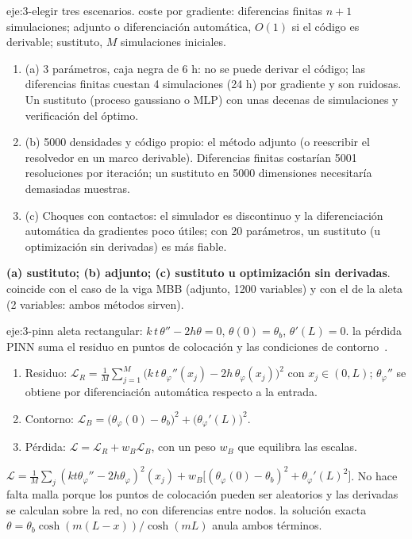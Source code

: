 \begin{solucion}{eje:3-elegir}
\datos tres escenarios.
\planteamiento coste por gradiente: diferencias finitas $n+1$ simulaciones; adjunto o diferenciación automática, $O(1)$ si el código es derivable; sustituto, $M$ simulaciones iniciales.
\pasos
\begin{enumerate}[label=\arabic*.]
  \item (a) 3 parámetros, caja negra de 6 h: no se puede derivar el código; las diferencias finitas cuestan 4 simulaciones (24 h) por gradiente y son ruidosas. Un sustituto (proceso gaussiano o MLP) con unas decenas de simulaciones y verificación del óptimo.
  \item (b) 5000 densidades y código propio: el método adjunto (o reescribir el resolvedor en un marco derivable). Diferencias finitas costarían 5001 resoluciones por iteración; un sustituto en 5000 dimensiones necesitaría demasiadas muestras.
  \item (c) Choques con contactos: el simulador es discontinuo y la diferenciación automática da gradientes poco útiles; con 20 parámetros, un sustituto (u optimización sin derivadas) es más fiable.
\end{enumerate}
\resultado \textbf{(a) sustituto; (b) adjunto; (c) sustituto u optimización sin derivadas}.
\comprobacion coincide con el caso de la viga MBB (adjunto, 1200 variables) y con el de la aleta (2 variables: ambos métodos sirven).
\end{solucion}

\begin{solucion}{eje:3-pinn}
\datos aleta rectangular: $k\,t\,\theta''-2h\theta=0$, $\theta(0)=\theta_b$, $\theta'(L)=0$.
\planteamiento la pérdida PINN suma el residuo en puntos de colocación y las condiciones de contorno~\cite{pinn}.
\pasos
\begin{enumerate}[label=\arabic*.]
  \item Residuo: $\mathcal{L}_R=\frac1M\sum_{j=1}^M\bigl(k\,t\,\theta_\varphi''(x_j)-2h\,\theta_\varphi(x_j)\bigr)^2$ con $x_j\in(0,L)$; $\theta_\varphi''$ se obtiene por diferenciación automática respecto a la entrada.
  \item Contorno: $\mathcal{L}_B=\bigl(\theta_\varphi(0)-\theta_b\bigr)^2+\bigl(\theta_\varphi'(L)\bigr)^2$.
  \item Pérdida: $\mathcal{L}=\mathcal{L}_R+w_B\mathcal{L}_B$, con un peso $w_B$ que equilibra las escalas.
\end{enumerate}
\resultado \textbf{$\mathcal{L}=\frac1M\sum_j(kt\theta_\varphi''-2h\theta_\varphi)^2(x_j)+w_B\bigl[(\theta_\varphi(0)-\theta_b)^2+\theta_\varphi'(L)^2\bigr]$}. No hace falta malla porque los puntos de colocación pueden ser aleatorios y las derivadas se calculan sobre la red, no con diferencias entre nodos.
\comprobacion la solución exacta $\theta=\theta_b\cosh(m(L-x))/\cosh(mL)$ anula ambos términos.
\end{solucion}

